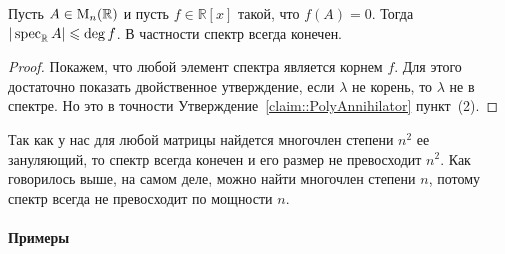 \begin{claim}
Пусть $A\in\operatorname{M}_{n}(\mathbb R)$ и пусть $f\in\mathbb R[x]$ такой, что $f(A) = 0$.
Тогда $|\operatorname{spec}_\mathbb R A|\leqslant \deg f$.
В частности спектр всегда конечен.
\end{claim}
\begin{proof}
Покажем, что любой элемент спектра является корнем $f$.
Для этого достаточно показать двойственное утверждение, если $\lambda$ не корень, то $\lambda$ не в спектре.
Но это в точности Утверждение~\ref{claim::PolyAnnihilator} пункт~(2).
\end{proof}

Так как у нас для любой матрицы найдется многочлен степени $n^2$ ее зануляющий, то спектр всегда конечен и его размер не превосходит $n^2$.
Как говорилось выше, на самом деле, можно найти многочлен степени $n$, потому спектр всегда не превосходит по мощности $n$.

\paragraph{Примеры}

